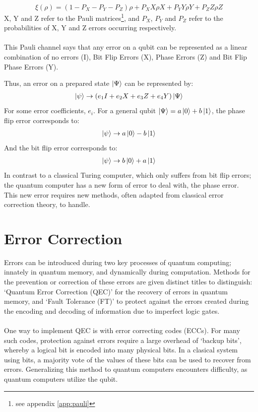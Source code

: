 \begin{equation}
\xi(\rho) = (1-P_X-P_Y-P_Z)\rho +P_XX\rho X+P_YY\rho Y +P_ZZ\rho Z
\label{eq:pauli}
\end{equation}
X, Y and Z refer to the Pauli matrices\footnote{see appendix \ref{app:pauli}}, and $P_X$, $P_Y$ and $P_Z$ refer to the probabilities of X, Y and Z errors occurring respectively.
\\\\
This Pauli channel says that any error on a qubit can be represented as a linear combination of no errors (I), Bit Flip Errors (X), Phase Errors (Z) and Bit Flip Phase Errors (Y). 

Thus, an error on a prepared state $\ket{\Psi}$ can be represented by:
\begin{align*}
\ket{\psi} \rightarrow (e_1I+e_2X+e_3Z+e_4Y)\ket{\Psi}
\end{align*}
For some error coefficients, $e_i$. For a general qubit $\ket{\Psi} = a\ket{0} + b \ket{1}$, the phase flip error corresponds to:
\begin{align*}
\ket{\psi} \rightarrow a\ket{0} - b \ket{1}
\end{align*}
And the bit flip error corresponds to:
\begin{align*}
\ket{\psi} \rightarrow b\ket{0} + a \ket{1}
\end{align*}
In contrast to a classical Turing computer, which only suffers from bit flip errors; the quantum computer has a new form of error to deal with, the phase error. This new error requires new methods, often adapted from classical error correction theory, to handle. 
\section{Error Correction}
Errors can be introduced during two key processes of quantum computing; innately in quantum memory, and dynamically during computation. Methods for the prevention or correction of these errors are given distinct titles to distinguish: `Quantum Error Correction (QEC)' for the recovery of errors in quantum memory, and `Fault Tolerance (FT)' to protect against the errors created during the encoding and decoding of information due to imperfect logic gates. 
\\\\
One way to implement  QEC is with error correcting codes (ECCs). For many such codes, protection against errors require a large overhead of `backup bits', whereby a logical bit is encoded into many physical bits. In a clasical system using bits, a majority vote of the values of these bits can be used to recover from errors. Generalizing this method to quantum computers encounters difficulty, as quantum computers utilize the qubit. 

